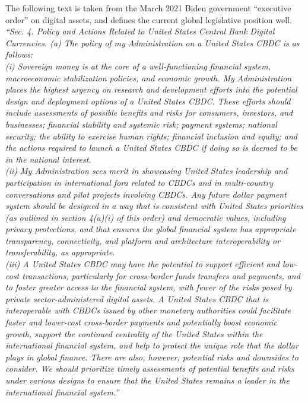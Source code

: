 The following text is taken from the March 2021 Biden government ``executive order'' on digital assets, and defines the current global legislative position well.\\
\textit{``Sec. 4.  Policy and Actions Related to United States Central Bank Digital Currencies.  (a)  The policy of my Administration on a United States CBDC is as follows:\\
(i) Sovereign money is at the core of a well-functioning financial system, macroeconomic stabilization policies, and economic growth.  My Administration places the highest urgency on research and development efforts into the potential design and deployment options of a United States CBDC.  These efforts should include assessments of possible benefits and risks for consumers, investors, and businesses; financial stability and systemic risk; payment systems; national security; the ability to exercise human rights; financial inclusion and equity; and the actions required to launch a United States CBDC if doing so is deemed to be in the national interest.\\
(ii)   My Administration sees merit in showcasing United States leadership and participation in international fora related to CBDCs and in multi‑country conversations and pilot projects involving CBDCs.  Any future dollar payment system should be designed in a way that is consistent with United States priorities (as outlined in section 4(a)(i) of this order) and democratic values, including privacy protections, and that ensures the global financial system has appropriate transparency, connectivity, and platform and architecture interoperability or transferability, as appropriate.\\
(iii)  A United States CBDC may have the potential to support efficient and low-cost transactions, particularly for cross‑border funds transfers and payments, and to foster greater access to the financial system, with fewer of the risks posed by private sector-administered digital assets.  A United States CBDC that is interoperable with CBDCs issued by other monetary authorities could facilitate faster and lower-cost cross-border payments and potentially boost economic growth, support the continued centrality of the United States within the international financial system, and help to protect the unique role that the dollar plays in global finance.  There are also, however, potential risks and downsides to consider.  We should prioritize timely assessments of potential benefits and risks under various designs to ensure that the United States remains a leader in the international financial system.''}\par

